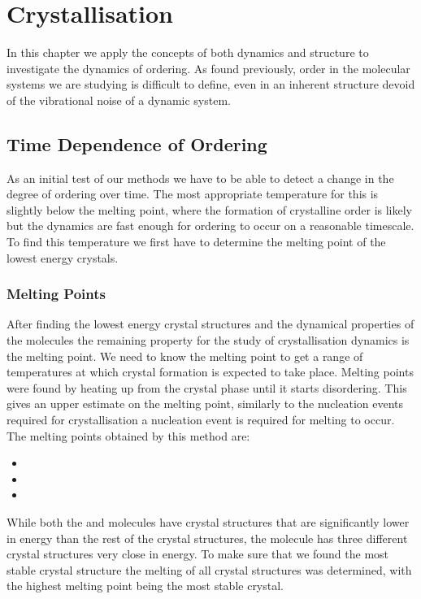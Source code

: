 \chapter{Crystallisation}

In this chapter we apply the concepts of both dynamics and structure to investigate the dynamics of ordering. As found previously, order in the molecular systems we are studying is difficult to define, even in an inherent structure devoid of the vibrational noise of a dynamic system.

\section{Time Dependence of Ordering}

As an initial test of our methods we have to be able to detect a change in the degree of ordering over time. The most appropriate temperature for this is slightly below the melting point, where the formation of crystalline order is likely but the dynamics are fast enough for ordering to occur on a reasonable timescale. To find this temperature we first have to determine the melting point of the lowest energy crystals.

\subsection{Melting Points}

After finding the lowest energy crystal structures and the dynamical properties of the molecules the remaining property for the study of crystallisation dynamics is the melting point. We need to know the melting point to get a range of temperatures at which crystal formation is expected to take place. Melting points were found by heating up from the crystal phase until it starts disordering. This gives an upper estimate on the melting point, similarly to the nucleation events required for crystallisation a nucleation event is required for melting to occur. The melting points obtained by this method are:
\begin{itemize}
    \item {}
    \item {}
    \item {}
\end{itemize}

While both the \sone and \scon molecules have crystal structures that are significantly lower in energy than the rest of the crystal structures, the \tri molecule has three different crystal structures very close in energy. To make sure that we found the most stable crystal structure the melting of all crystal structures was determined, with the highest melting point being the most stable crystal.

